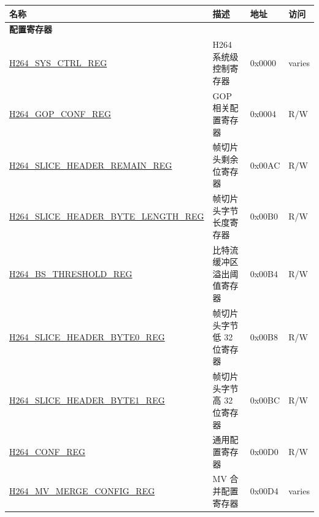 \begin{longtable}{ | p{7cm} | p{6.2cm} | p{1.2cm} | p{1cm} | }
\hline\rowcolor{lightgray}
{\bfseries 名称} & {\bfseries 描述} &  {\bfseries 地址} & {\bfseries 访问} \\ \hline
\endhead
\multicolumn{4}{|l|}{\textbf{配置寄存器}} \\ \hline
\hyperref[regdesc:H264SYSCTRLREG]{H264\_SYS\_CTRL\_REG} & H264 系统级控制寄存器 & 0x0000 & varies \\ \hline
\hyperref[regdesc:H264GOPCONFREG]{H264\_GOP\_CONF\_REG} & GOP 相关配置寄存器 & 0x0004 & R/W \\ \hline
\hyperref[regdesc:H264SLICEHEADERREMAINREG]{H264\_SLICE\_HEADER\_REMAIN\_REG} & 帧切片头剩余位寄存器 & 0x00AC & R/W \\ \hline
\hyperref[regdesc:H264SLICEHEADERBYTELENGTHREG]{H264\_SLICE\_HEADER\_BYTE\_LENGTH\_REG} & 帧切片头字节长度寄存器 & 0x00B0 & R/W \\ \hline
\hyperref[regdesc:H264BSTHRESHOLDREG]{H264\_BS\_THRESHOLD\_REG} & 比特流缓冲区溢出阈值寄存器 & 0x00B4 & R/W \\ \hline
\hyperref[regdesc:H264SLICEHEADERBYTE0REG]{H264\_SLICE\_HEADER\_BYTE0\_REG} & 帧切片头字节低 32 位寄存器 & 0x00B8 & R/W \\ \hline
\hyperref[regdesc:H264SLICEHEADERBYTE1REG]{H264\_SLICE\_HEADER\_BYTE1\_REG} & 帧切片头字节高 32 位寄存器 & 0x00BC & R/W \\ \hline
\hyperref[regdesc:H264CONFREG]{H264\_CONF\_REG} & 通用配置寄存器 & 0x00D0 & R/W \\ \hline
\hyperref[regdesc:H264MVMERGECONFIGREG]{H264\_MV\_MERGE\_CONFIG\_REG} & MV 合并配置寄存器 & 0x00D4 & varies \\ \hline


\end{longtable}
